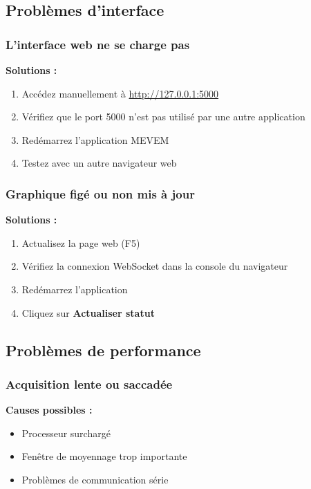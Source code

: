 \documentclass[12pt,a4paper]{article}
\begin{document}
\subsection{Problèmes d'interface}

\subsubsection{L'interface web ne se charge pas}

\textbf{Solutions :}
\begin{enumerate}
    \item Accédez manuellement à \url{http://127.0.0.1:5000}
    \item Vérifiez que le port 5000 n'est pas utilisé par une autre application
    \item Redémarrez l'application MEVEM
    \item Testez avec un autre navigateur web
\end{enumerate}

\subsubsection{Graphique figé ou non mis à jour}

\textbf{Solutions :}
\begin{enumerate}
    \item Actualisez la page web (F5)
    \item Vérifiez la connexion WebSocket dans la console du navigateur
    \item Redémarrez l'application
    \item Cliquez sur \textbf{Actualiser statut}
\end{enumerate}

\subsection{Problèmes de performance}

\subsubsection{Acquisition lente ou saccadée}

\textbf{Causes possibles :}
\begin{itemize}
    \item Processeur surchargé
    \item Fenêtre de moyennage trop importante
    \item Problèmes de communication série
\end{itemize}
\end{document}

